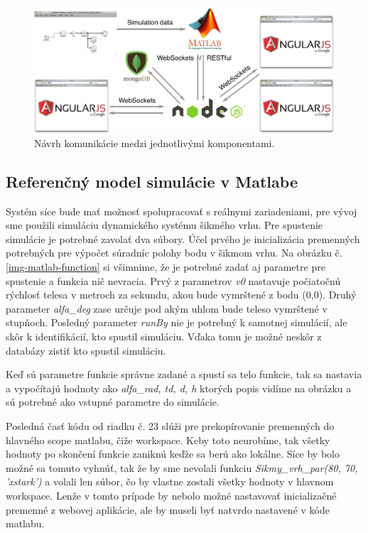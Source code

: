 \begin{figure}[H]
  \centering
  \includegraphics[scale=0.4]{img/software-design.png}
  \caption{Návrh komunikácie medzi jednotlivými komponentami.}
  \label{img-software-designl}
\end{figure}

\subsection{Referenčný model simulácie v Matlabe}
Systém síce bude mať možnosť spolupracovať s reálnymi zariadeniami, pre vývoj sme použili simuláciu dynamického systému šikmého vrhu. Pre spustenie simulácie je potrebné zavolať dva súbory. Účel prvého je inicializácia premenných potrebných pre výpočet súradníc polohy bodu v šikmom vrhu. Na obrázku č.\ref{img-matlab-function} si všimnime, že je potrebné zadať aj parametre pre spustenie a funkcia nič nevracia. Prvý z parametrov \textit{v0} nastavuje počiatočnú rýchlosť telesa v metroch za sekundu, akou bude vymrštené z bodu (0,0). Druhý parameter \textit{alfa\_deg} zase určuje pod akým uhlom bude teleso vymrštené v stupňoch. Posledný parameter \textit{runBy} nie je potrebný k samotnej simulácií, ale skôr k identifikácií, kto spustil simuláciu. Vďaka tomu je možné neskôr z databázy zistiť kto spustil simuláciu.

Keď sú parametre funkcie správne zadané a spustí sa telo funkcie, tak sa nastavia a vypočítajú hodnoty ako \textit{alfa\_rad, td, d, h} ktorých popis vidíme na obrázku a sú potrebné ako vstupné parametre do simulácie.

Posledná časť kódu od riadku č. 23 slúži pre prekopírovanie premenných do hlavného scope matlabu, čiže workspace. Keby toto neurobíme, tak všetky hodnoty po skončení funkcie zaniknú keďže sa berú ako lokálne. Síce by bolo možné sa tomuto vyhnúť, tak že by sme nevolali funkciu \textit{Sikmy\_vrh\_par(80, 70, 'xstark')} a volali len súbor, čo by vlastne zostali všetky hodnoty v hlavnom workspace. Lenže v tomto prípade by nebolo možné nastavovať inicializačné premenné z webovej aplikácie, ale by museli byť natvrdo nastavené v kóde matlabu.

